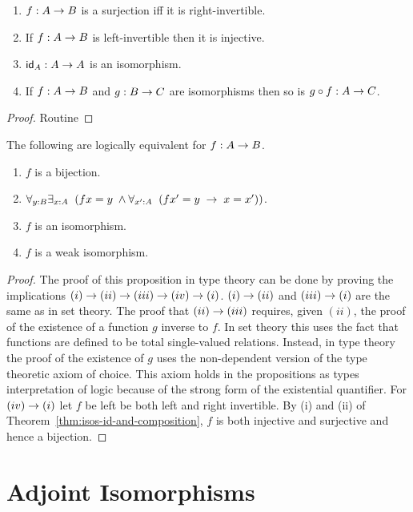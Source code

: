 \begin{thm}\label{thm:isos-id-and-composition} $\;$
\begin{enumerate}
\item $f:A\ra B$ is a surjection iff it is right-invertible.
\item If $f:A\ra B$ is left-invertible then it is injective.
\item $\idfunc[A]:A\ra A$ is an isomorphism.
\item If $f:A\ra B$ and $g:B\ra C$ are isomorphisms then so is $g\circ f:A\ra C$.
\end{enumerate}
\end{thm}
\begin{proof} Routine
\end{proof}
\begin{thm}\label{thm:bijections-isos}
The following are logically equivalent for $f:A\ra B$.
\begin{enumerate}
\item $f$ is a bijection.
\item $\forall_{y:B}\exists_{x:A}\;\; (fx=y\;\wedge \forall_{x':A}\;\; (fx'=y\;\ra\; x=x'))$.
\item $f$ is an isomorphism.
\item $f$ is a weak isomorphism.
\end{enumerate}
\end{thm}
\begin{proof}
The proof of this proposition in type theory can be done by proving the implications $(i)\ra (ii)\ra (iii)\ra (iv)\ra (i)$.  $(i)\ra (ii)$ and $(iii)\ra (i)$ are the same as in set theory.  The proof that $(ii)\ra (iii)$ requires, given $(ii)$, the proof of the existence of a function $g$ inverse to $f$.  In set theory this uses the fact that functions are defined to be total single-valued relations.  Instead, in type theory the proof of the existence of $g$
uses the non-dependent version of the type theoretic axiom of choice.  This axiom holds in the propositions as types interpretation of logic because of the strong form of the existential quantifier.  For $(iv)\ra (i)$ let $f$ be left be both left and right invertible.  By (i) and (ii) of Theorem~\ref{thm:isos-id-and-composition}, $f$ is both injective and surjective and hence a bijection.  
\end{proof}
\newpage

\section{Adjoint  Isomorphisms}

